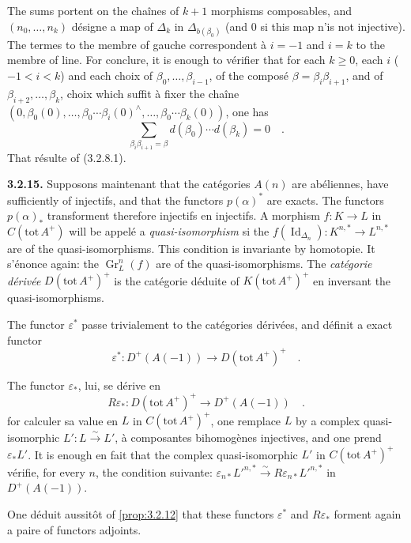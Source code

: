 \documentclass[12pt,a4paper]{article}
\theoremstyle{plain}
\theoremstyle{definition}
\DeclareMathOperator{\Id}{Id}
\DeclareMathOperator{\Gr}{Gr}
\newcommand{\isom}{\xrightarrow{\sim}}
\begin{document}
The sums portent on the cha\^{i}nes of $k+1$ morphisms composables, and $(n_{0},\ldots,n_{k})$ d\'{e}signe a map of $\Delta_{k}$ in $\Delta_{b(\beta_{0})}$ (and $0$ si this map n'is not injective). The termes to the membre of gauche correspondent \`{a} $i=-1$ and $i=k$ to the membre of line. For conclure, it is enough to v\'{e}rifier that for each $k \geq 0$, each $i$ ($-1 < i < k$) and each choix of $\beta_{0},\ldots,\beta_{i-1}$, of the compos\'{e} $\beta = \beta_{i}\beta_{i+1}$, and of $\beta_{i+2},\ldots,\beta_{k}$, choix which suffit \`{a} fixer the cha\^{i}ne $(0,\beta_{0}(0),\ldots,\beta_{0}\cdots\beta_{i}(0)^{\wedge},\ldots,\beta_{0}\cdots\beta_{k}(0))$, one has
\[
\sum_{\beta_{i}\beta_{i+1}=\beta} d(\beta_{0})\cdots d(\beta_{k}) = 0\quad.
\]
That r\'{e}sulte of (3.2.8.1).

\noindent\textbf{3.2.15.} Supposons maintenant that the cat\'{e}gories $A(n)$ are ab\'{e}liennes, have sufficiently of injectifs, and that the functors $p(\alpha)^{*}$ are exacts. The functors $p(\alpha)_{*}$ transforment therefore injectifs en injectifs. A morphism $f: K \to L$ in $C(\mathrm{tot}\, A^{+})$ will be appel\'{e} a \emph{quasi-isomorphism} si the $f(\Id_{\Delta_{n}}): K^{n,*} \to L^{n,*}$ are of the quasi-isomorphisms. This condition is invariante by homotopie. It s'\'{e}nonce again: the $\Gr^{n}_{L}(f)$ are of the quasi-isomorphisms. The \emph{cat\'{e}gorie d\'{e}riv\'{e}e} $D(\mathrm{tot}\, A^{+})^{+}$ is the cat\'{e}gorie d\'{e}duite of $K(\mathrm{tot}\, A^{+})^{+}$ en inversant the quasi-isomorphisms.

The functor $\varepsilon^{*}$ passe trivialement to the cat\'{e}gories d\'{e}riv\'{e}es, and d\'{e}finit a exact functor
\[
\varepsilon^{*}: D^{+}(A(-1)) \longrightarrow D(\mathrm{tot}\, A^{+})^{+}\quad.
\]

The functor $\varepsilon_{*}$, lui, se d\'{e}rive en
\[
R\varepsilon_{*}: D(\mathrm{tot}\, A^{+})^{+} \longrightarrow D^{+}(A(-1))\quad.
\]
for calculer sa value en $L$ in $C(\mathrm{tot}\, A^{+})^{+}$, one remplace $L$ by a complex quasi-isomorphic $L': L \isom L'$, \`{a} composantes bihomog\`{e}nes injectives, and one prend $\varepsilon_{*}L'$. It is enough en fait that the complex quasi-isomorphic $L'$ in $C(\mathrm{tot}\, A^{+})^{+}$ v\'{e}rifie, for every $n$, the condition suivante: $\varepsilon_{n*}L'^{n,*} \isom R\varepsilon_{n*}L'^{n,*}$ in $D^{+}(A(-1))$.

One d\'{e}duit aussit\^{o}t of \ref{prop:3.2.12} that these functors $\varepsilon^{*}$ and $R\varepsilon_{*}$ forment again a paire of functors adjoints.
\end{document}
